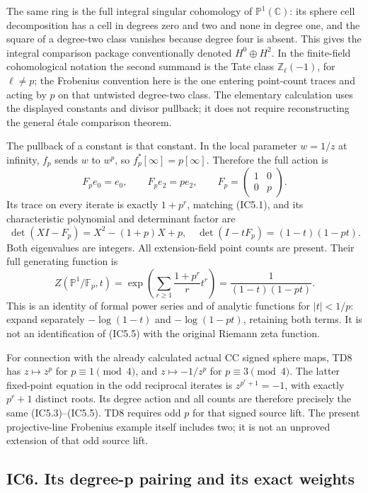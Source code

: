 \documentclass[
]{article}
\newcounter{none} %
\begin{document}
The same ring is the full integral singular cohomology of
\(\mathbb P^1(\mathbb C)\): its sphere cell decomposition has a cell in
degrees zero and two and none in degree one, and the square of a
degree-two class vanishes because degree four is absent. This gives the
integral comparison package conventionally denoted \(H^0\oplus H^2\). In
the finite-field cohomological notation the second summand is the Tate
class \(\mathbb Z_\ell(-1)\), for \(\ell\ne p\); the Frobenius
convention here is the one entering point-count traces and acting by
\(p\) on that untwisted degree-two class. The elementary calculation
uses the displayed constants and divisor pullback; it does not require
reconstructing the general étale comparison theorem.

The pullback of a constant is that constant. In the local parameter
\(w=1/z\) at infinity, \(f_p\) sends \(w\) to \(w^p\), so
\(f_p^*[\infty]=p[\infty]\). Therefore the full action is \[
F_pe_0=e_0,\qquad F_pe_2=pe_2,
\qquad F_p=\begin{pmatrix}1&0\\0&p\end{pmatrix}.
\tag{IC5.3}
\] Its trace on every iterate is exactly \(1+p^r\), matching (IC5.1),
and its characteristic polynomial and determinant factor are \[
\det(XI-F_p)=X^2-(1+p)X+p,
\quad
\det(I-tF_p)=(1-t)(1-pt).
\tag{IC5.4}
\] Both eigenvalues are integers. All extension-field point counts are
present. Their full generating function is \[
Z(\mathbb P^1/\mathbb F_p,t)
=\exp\left(\sum_{r\ge1}\frac{1+p^r}{r}t^r\right)
=\frac1{(1-t)(1-pt)}.
\tag{IC5.5}
\] This is an identity of formal power series and of analytic functions
for \(|t|<1/p\): expand separately \(-\log(1-t)\) and \(-\log(1-pt)\),
retaining both terms. It is not an identification of (IC5.5) with the
original Riemann zeta function.

For connection with the already calculated actual CC signed sphere maps,
TD8 has \(z\mapsto z^p\) for \(p\equiv1\pmod4\), and \(z\mapsto-1/z^p\)
for \(p\equiv3\pmod4\). The latter fixed-point equation in the odd
reciprocal iterates is \(z^{p^r+1}=-1\), with exactly \(p^r+1\) distinct
roots. Its degree action and all counts are therefore precisely the same
(IC5.3)--(IC5.5). TD8 requires odd \(p\) for that signed source lift.
The present projective-line Frobenius example itself includes two; it is
not an unproved extension of that odd source lift.

\subsection{IC6. Its degree-p pairing and its exact
weights}\label{ic6.-its-degree-p-pairing-and-its-exact-weights}
\end{document}
